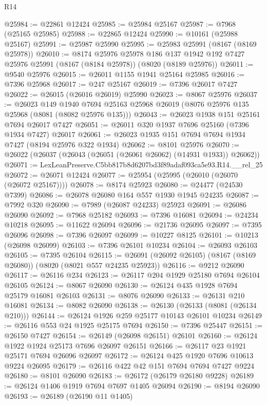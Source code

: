 \begin{lexlean}{R14}
\begin{coremodule}
@25984 := @22861 @12424
@25985 := @25984 @25167
@25987 := @7968 (@25165 @25985)
@25988 := @22865 @12424
@25990 := @10161 (@25988 @25167)
@25991 := @25987 @25990
@25995 := @25983 @25991 (@8167 (@8169 @25978))
@26010 := @8174
    @25976
    @25978
    @186
    @137
    @1942
    @192
    @7427
    @25976
    @25991
    (@8167 (@8184 @25978))
    (@8020 (@8189 @25976))
@26011 := @9540 @25976
@26015 := @26011 @1155 @1941 @25164 @25985
@26016 := @7396 @25968
@26017 := @247 @25167
@26019 := @7396 @26017 @7427
@26022 := @26015 (@26016 @26019) @25990
@26023 := @8067 @25976
@26037 := @26023
    @149
    @1940
    @7694
    @25163
    @25968
    @26019
    (@8076 @25976 @135 @25968 (@8081 (@8082 @25976 @135)))
@26043 := @26023 @1938 @151 @25161 @7694 @26017 @7427
@26051 := @26011 @320 @1937 @7696 @25160 (@7396 @1934 @7427) @26017
@26061 := @26023 @1935 @151 @7694 @7694 @1934 @7427 (@8194 @25976 @322 @1934)
@26062 := @8101 @25976
@26070 := @26022 (@26037 (@26043 (@26051 (@26061 @26062) (@14931 @1933)) @26062))
@26071 := LexLeanPreserve.C5bb817b8d6207bd3f89adaf093ca5e93.R14.__rel_25
@26072 := @26071 @12424
@26077 := @25954 (@25995 (@26010 (@26070 (@26072 @25167))))
@26078 := @8174 @25923
@26080 := @24477 (@24530 @7399)
@26086 := @26078 @26080 @164 @557 @1930 @1945 @24235
@26087 := @7992 @320
@26090 := @7989 (@26087 @24233) @25923
@26091 := @26086 @26090
@26092 := @7968 @25182
@26093 := @7396 @16081
@26094 := @24234 @10218
@26095 := @11622 @26094
@26096 := @21736 @26095
@26097 := @7395 @26096
@26098 := @7396 @26097
@26099 := @10227 @8125
@26101 := @10213 (@26098 @26099)
@26103 := @7396 @26101 @10234
@26104 := @26093 @26103
@26105 := @7395 @26104
@26115 := @26091 (@26092 @26105) (@8167 (@8169 @26080)) (@8020 (@8021 @557 @24235 @25923))
@26116 := @9212 @26090
@26117 := @26116 @234
@26123 := @26117 @204 @1929 @25180 @7694 @26104 @26105
@26124 := @8067 @26090
@26130 := @26124 @435 @1928 @7694 @25179 @16081 @26103
@26131 := @8076 @26090
@26133 := @26131 @210 @16081
@26134 := @8082 @26090
@26138 := @26130 (@26133 (@8081 (@26134 @210)))
@26144 := @26124 @1926 @259 @25177 @10143 @26101 @10234
@26149 := @26116 @553 @24 @1925 @25175 @7694
@26150 := @7396 @25447
@26151 := @26150 @7427
@26154 := @26149 (@26098 @26151) @26101
@26160 := @26124 @1922 @1924 @25173 @7696 @26097 @26151
@26166 := @26117 @23 @1921 @25171 @7694 @26096 @26097
@26172 := @26124 @425 @1920 @7696 @10613 @9224 @26095
@26179 := @26116 @422 @42 @151 @7694 @7694 @7427 @9224
@26180 := @8101 @26090
@26183 := @26172 (@26179 @26180 @9228)
@26189 := @26124 @1406 @1919 @7694 @7697 @1405 @26094
@26190 := @8194 @26090
@26193 := @26189 (@26190 @11 @1405)

\end{coremodule}
\end{lexlean}
